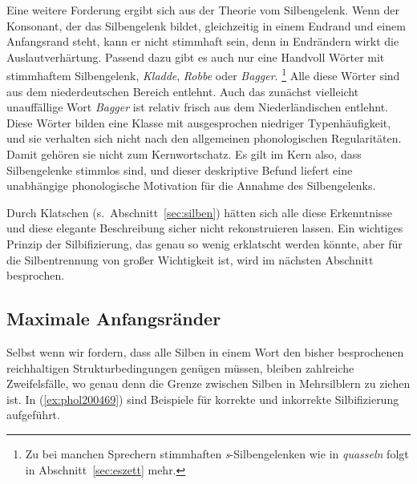 \label{abs:silbengelenkstimmlos}
Eine weitere Forderung ergibt sich aus der Theorie vom Silbengelenk.
Wenn der Konsonant, der das Silbengelenk bildet, gleichzeitig in einem Endrand und einem Anfangsrand steht, kann er nicht stimmhaft sein, denn in Endrändern wirkt die Auslautverhärtung.
\label{abs:robbe}Passend dazu gibt es auch nur eine Handvoll Wörter mit stimmhaftem Silbengelenk, \zB \textit{Kladde}, \textit{Robbe} oder \textit{Bagger}.%
\footnote{Zu bei manchen Sprechern stimmhaften \textit{s}-Silbengelenken wie in \textit{quasseln} folgt in Abschnitt~\ref{sec:eszett} mehr.}
Alle diese Wörter sind aus dem niederdeutschen Bereich entlehnt.
Auch das zunächst vielleicht unauffällige Wort \textit{Bagger} ist relativ frisch aus dem Niederländischen entlehnt.
Diese Wörter bilden eine Klasse mit ausgesprochen niedriger Typenhäufigkeit, und sie verhalten sich nicht nach den allgemeinen phonologischen Regularitäten.
Damit gehören sie nicht zum Kernwortschatz.
Es gilt im Kern also, dass Silbengelenke stimmlos sind, und dieser deskriptive Befund liefert eine unabhängige phonologische Motivation für die Annahme des Silbengelenks.

Durch Klatschen (s.\ Abschnitt~\ref{sec:silben}) hätten sich alle diese Erkenntnisse und diese elegante Beschreibung sicher nicht rekonstruieren lassen.
Ein wichtiges Prinzip der Silbifizierung, das genau so wenig erklatscht werden könnte, aber für die Silbentrennung von großer Wichtigkeit ist, wird im nächsten Abschnitt besprochen.

\subsection{Maximale Anfangsränder}

\label{sec:maximaleanfangsraender}

Selbst wenn wir fordern, dass alle Silben in einem Wort den bisher besprochenen reichhaltigen Strukturbedingungen genügen müssen, bleiben zahlreiche Zweifelsfälle, wo genau denn die Grenze zwischen Silben in Mehrsilblern zu ziehen ist.
In (\ref{ex:phol200469}) sind Beispiele für korrekte und inkorrekte Silbifizierung aufgeführt.

\begin{exe}
  \ex \label{ex:phol200469}
  \begin{xlist}
  \end{xlist}
\end{exe}


